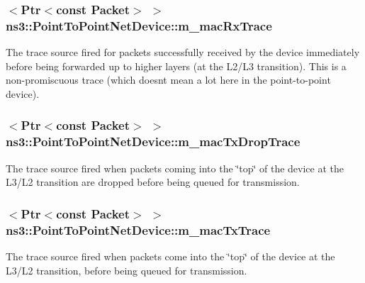 \subsubsection[{\texorpdfstring{m\+\_\+mac\+Rx\+Trace}{m_macRxTrace}}]{$<${\bf Ptr}$<$const {\bf Packet}$>$ $>$ ns3\+::\+Point\+To\+Point\+Net\+Device\+::m\+\_\+mac\+Rx\+Trace\hspace{0.3cm}{\ttfamily [private]}}\hypertarget{classns3_1_1PointToPointNetDevice_a1b4ac13e16c7028bbb1593f2fca53280}{}\label{classns3_1_1PointToPointNetDevice_a1b4ac13e16c7028bbb1593f2fca53280}
The trace source fired for packets successfully received by the device immediately before being forwarded up to higher layers (at the L2/\+L3 transition). This is a non-\/promiscuous trace (which doesn\textquotesingle{}t mean a lot here in the point-\/to-\/point device). 
\subsubsection[{\texorpdfstring{m\+\_\+mac\+Tx\+Drop\+Trace}{m_macTxDropTrace}}]{$<${\bf Ptr}$<$const {\bf Packet}$>$ $>$ ns3\+::\+Point\+To\+Point\+Net\+Device\+::m\+\_\+mac\+Tx\+Drop\+Trace\hspace{0.3cm}{\ttfamily [private]}}\hypertarget{classns3_1_1PointToPointNetDevice_ae8c1d85f19dd5ae51c2ec0bde51f716d}{}\label{classns3_1_1PointToPointNetDevice_ae8c1d85f19dd5ae51c2ec0bde51f716d}
The trace source fired when packets coming into the \char`\"{}top\char`\"{} of the device at the L3/\+L2 transition are dropped before being queued for transmission. 
\subsubsection[{\texorpdfstring{m\+\_\+mac\+Tx\+Trace}{m_macTxTrace}}]{$<${\bf Ptr}$<$const {\bf Packet}$>$ $>$ ns3\+::\+Point\+To\+Point\+Net\+Device\+::m\+\_\+mac\+Tx\+Trace\hspace{0.3cm}{\ttfamily [private]}}\hypertarget{classns3_1_1PointToPointNetDevice_a1f915201c9a40e6221a61477590ddfef}{}\label{classns3_1_1PointToPointNetDevice_a1f915201c9a40e6221a61477590ddfef}
The trace source fired when packets come into the \char`\"{}top\char`\"{} of the device at the L3/\+L2 transition, before being queued for transmission. 
